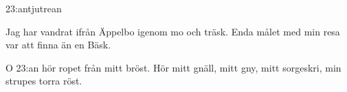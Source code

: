 \begin{song}{23:an}{tjutrean}
\begin{vers}
Jag har vandrat ifrån Äppelbo
igenom mo och träsk.
Enda målet med min resa var
att finna än en Bäsk.
\end{vers}
\begin{vers}
O 23:an hör ropet från mitt bröst.
Hör mitt gnäll, mitt gny,
mitt sorgeskri,
min strupes torra röst.
\end{vers}
\end{song}
